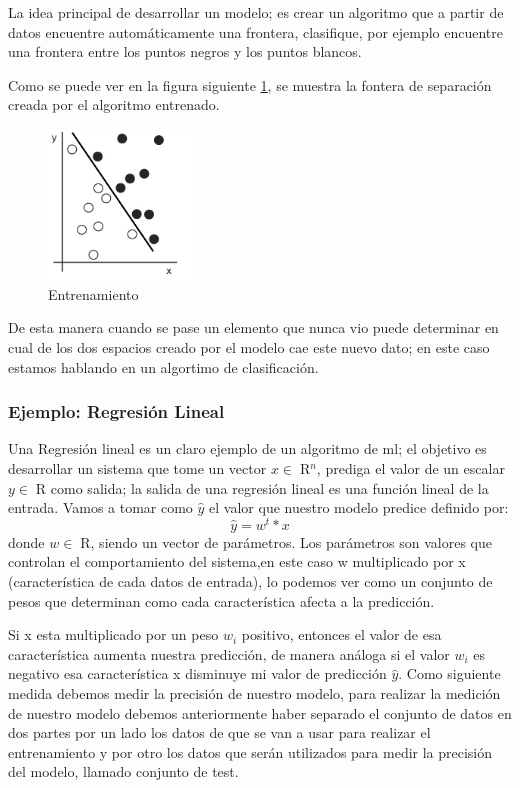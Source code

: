 La idea principal de desarrollar un modelo; es crear un algoritmo que a partir de datos encuentre automáticamente una frontera, clasifique, por ejemplo encuentre una frontera entre los puntos negros y los puntos blancos.

Como se puede ver en la figura siguiente \ref{Fig:ejemplo-2}, se muestra la fontera de separación creada por el algoritmo entrenado.
\begin{figure}[H] \centering
  \includegraphics[height=4cm,keepaspectratio=true,clip=true]{imagenes/MarcoTeorico/sample-fit-1.png}
  \caption{Entrenamiento}\label{Fig:ejemplo-2}
\end{figure}

De esta manera cuando se pase un elemento que nunca vio puede determinar en cual de los dos espacios creado por el modelo cae este nuevo dato; en este caso estamos hablando en un algortimo de clasificación.

\subsubsection*{Ejemplo: Regresión Lineal}
Una Regresión lineal es un claro ejemplo de un algoritmo de \ac{ml}; el objetivo es desarrollar un sistema que tome un vector $x \in \; $R$^n$, prediga el valor de un escalar $y \in \; $R$ $ como salida; la salida de una regresión lineal es una función lineal de la entrada.  Vamos a tomar como $\hat{y}$ el valor que nuestro modelo predice definido por:
\begin{equation}
\hat{y} = w^t * x
\end{equation}
donde $w \in \; $R$ $, siendo un vector de parámetros.
Los parámetros son valores que controlan el comportamiento del sistema,en este caso w  multiplicado por x (característica de cada datos de entrada), lo podemos ver como un conjunto de pesos que determinan como cada característica afecta a la predicción.

Si x esta multiplicado por un peso $w_i $ positivo, entonces el valor de esa característica aumenta nuestra predicción, de manera análoga si el valor $w_i $ es negativo esa característica x disminuye mi valor de predicción $\hat{y}$.
Como siguiente medida debemos medir la precisión de nuestro modelo, para realizar la medición de nuestro modelo debemos anteriormente haber separado el conjunto de datos en dos partes por un lado los datos de que se van a usar para realizar el entrenamiento y por otro los datos que serán utilizados para medir la precisión del modelo, llamado conjunto de test.

